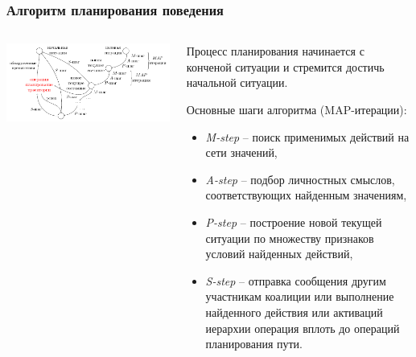 \documentclass[default]{beamer}
\begin{document}
	\begin{frame}
		\frametitle{Алгоритм планирования поведения}
		
		\begin{columns}
			\begin{column}{0.7\textwidth}
				\includegraphics[width=\textwidth]{algo/ru/beh_plan_ru}
			\end{column}
			\begin{column}{0.3\textwidth}
				\tiny
				Процесс планирования начинается с конченой ситуации и стремится достичь начальной ситуации.
				\par\bigskip
				Основные шаги алгоритма (MAP-итерации):
				\begin{itemize}
					\item \textit{M-step} -- поиск применимых действий на сети значений,
					\item \textit{A-step} -- подбор личностных смыслов, соответствующих найденным значениям,
					\item \textit{P-step} -- построение новой текущей ситуации по множеству признаков условий найденных действий,
					\item \textit{S-step} -- отправка сообщения другим участникам коалиции или выполнение найденного действия или активаций иерархии операция вплоть до операций планирования пути.
				\end{itemize}
			\end{column}
		\end{columns}
		\nocite{*}
		\printbibliography[keyword={behplan}, resetnumbers=true]
	\end{frame}	
\end{document}

